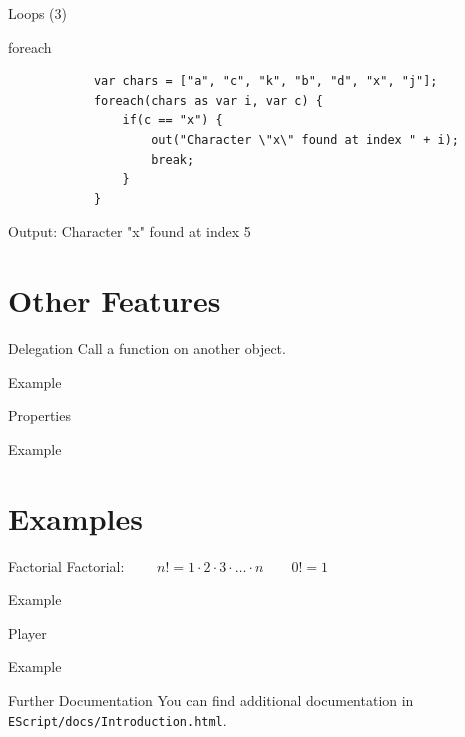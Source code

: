 \documentclass[ucs,9pt]{beamer}
\begin{document}
\begin{frame}[fragile]{Loops (3)}
	\begin{block}{foreach}
		\begin{lstlisting}
			var chars = ["a", "c", "k", "b", "d", "x", "j"];
			foreach(chars as var i, var c) {
			    if(c == "x") {
			        out("Character \"x\" found at index " + i);
			        break;
			    }
			}
		\end{lstlisting}
	\end{block}
	Output: Character "x" found at index 5
\end{frame}

\section{Other Features}
\begin{frame}{Delegation}
	Call a function on another object.
	\begin{block}{Example}
		
	\end{block}
\end{frame}

\begin{frame}{Properties}
	\begin{block}{Example}
		
	\end{block}
\end{frame}

\section{Examples}
\begin{frame}{Factorial}
	Factorial: $\qquad n! = 1 \cdot 2 \cdot 3 \cdot \ldots \cdot n \qquad 0! = 1$
	\begin{block}{Example}
		
	\end{block}
\end{frame}

\begin{frame}{Player}
	\begin{block}{Example}
		
	\end{block}
\end{frame}

\begin{frame}{Further Documentation}
	You can find additional documentation in \texttt{EScript/docs/Introduction.html}.
\end{frame}

\HNIlastframe
\end{document}
